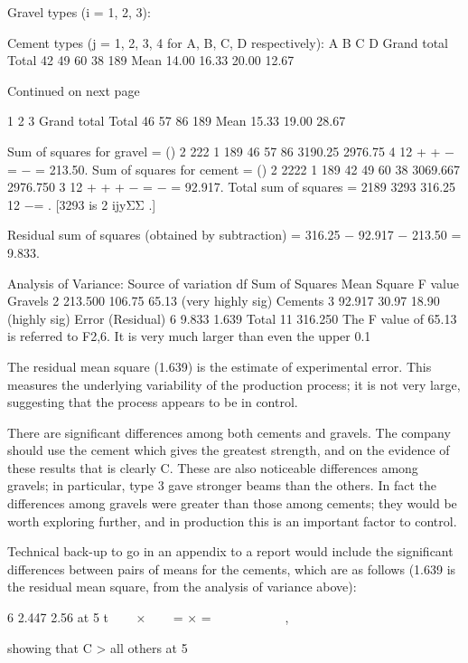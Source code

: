 \documentclass[a4paper,12pt]{article}
\begin{document}
\begin{enumerate}
Gravel types (i = 1, 2, 3): 
 
 
 
Cement types (j = 1, 2, 3, 4 for A, B, C, D respectively): 
  A B C D Grand total Total 42 49 60 38 189 Mean 14.00 16.33 20.00 12.67  
 
Continued on next page 
 
 1 2 3 Grand total Total 46 57 86 189 Mean 15.33 19.00 28.67  

 
 
Sum of squares for gravel = () 2 222 1 189 46 57 86 3190.25 2976.75 4 12 + + − = −  = 213.50. Sum of squares for cement = () 2 2222 1 189 42 49 60 38 3069.667 2976.750 3 12 + + + − = − = 92.917. Total sum of squares = 2189 3293 316.25 12 −= .        [3293 is 2 ijyΣΣ .] 
 
Residual sum of squares (obtained by subtraction) = 316.25 − 92.917 − 213.50 = 9.833. 
 
Analysis of Variance: 
 Source of variation df Sum of Squares Mean Square F value Gravels   2 213.500 106.75 65.13  (very highly sig) Cements   3   92.917   30.97 18.90   (highly sig) Error (Residual)   6     9.833       1.639  Total 11 316.250   
 The F value of 65.13 is referred to F2,6.  It is very much larger than even the upper 0.1%
 
The residual mean square (1.639) is the estimate of experimental error.  This measures the underlying variability of the production process;  it is not very large, suggesting that the process appears to be in control. 
 
There are significant differences among both cements and gravels.  The company should use the cement which gives the greatest strength, and on the evidence of these results that is clearly C.  These are also noticeable differences among gravels;  in particular, type 3 gave stronger beams than the others.  In fact the differences among gravels were greater than those among cements;  they would be worth exploring further, and in production this is an important factor to control. 
 
 
Technical back-up to go in an appendix to a report would include the significant differences between pairs of means for the cements, which are as follows (1.639 is the residual mean square, from the analysis of variance above): 
 
6
2.447 2.56 at 5%
t
   ×    = × =         
  , 
 
showing that C > all others at 5%

\end{enumerate}
\end{document}
